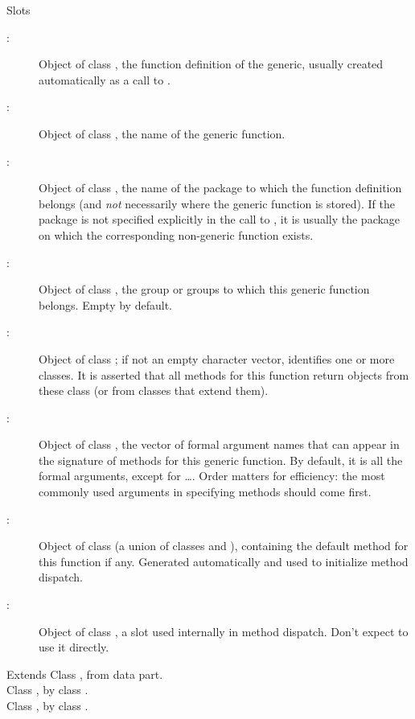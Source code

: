 %
\begin{Section}{Slots}
\begin{description}

\item[:] Object of class , the
function definition of the generic, usually created
automatically as a call to . 
\item[:] Object of class , the
name of the generic function. 
\item[:] Object of class , the
name of the package to which the function definition belongs
(and \emph{not} necessarily where the generic function is
stored). If the package is not specified explicitly in the
call to , it is usually the package on which
the corresponding non-generic function exists. 
\item[:] Object of class , the group or
groups to which this generic function belongs.  Empty by default. 
\item[:] Object of class ; if
not an empty character vector, identifies one or more classes.  It is
asserted that all methods for this function return objects
from these class (or from classes that extend them). 
\item[:] Object of class , the
vector of formal argument names that can appear in the
signature of methods for this generic function.  By default,
it is all the formal arguments, except for \dots.  Order
matters for efficiency:  the most commonly used arguments in
specifying methods should come first. 
\item[:] Object of class 
(a union of classes  and ), containing
the default method for this function if any.  Generated
automatically and used to initialize method dispatch. 
\item[:] Object of class , a slot used
internally in method dispatch.  Don't expect to use it
directly.

\end{description}

\end{Section}
%
\begin{Section}{Extends}
Class , from data part.\\{}
Class , by class .\\{}
Class , by class .
\end{Section}
